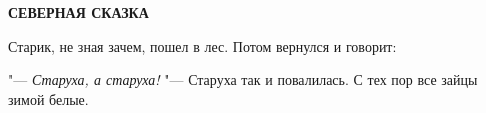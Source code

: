\begin{center}
    \textbf{СЕВЕРНАЯ СКАЗКА}
\end{center}

Старик, не зная зачем, пошел в лес.  Потом вернулся и говорит:

"--- \textit{Старуха,  а старуха!} "--- Старуха так и повалилась.  С тех пор все зайцы зимой белые.